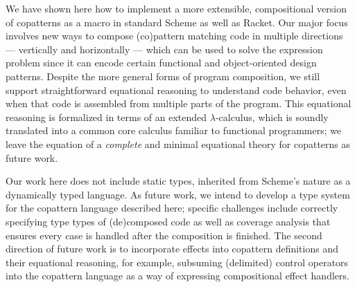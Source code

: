 We have shown here how to implement a more extensible, compositional version of copatterns as a macro in standard Scheme as well as Racket.
Our major focus involves new ways to compose (co)pattern matching code in multiple directions --- vertically and horizontally --- which can be used to solve the expression problem since it can encode certain functional and object-oriented design patterns.
Despite the more general forms of program composition, we still support straightforward equational reasoning to understand code behavior, even when that code is assembled from multiple parts of the program.
This equational reasoning is formalized in terms of an extended $\lambda$-calculus, which is soundly translated into a common core calculus familiar to functional programmers;
we leave the equation of a \emph{complete} and minimal equational theory for copatterns as future work.

Our work here does not include static types, inherited from Scheme's nature as a dynamically typed language.
As future work, we intend to develop a type system for the copattern language described here; specific challenges include correctly specifying type types of (de)composed code as well as coverage analysis that ensures every case is handled after the composition is finished.
The second direction of future work is to incorporate effects into copattern definitions and their equational reasoning, for example, subsuming (delimited) control operators into the copattern language as a way of expressing compositional effect handlers.


